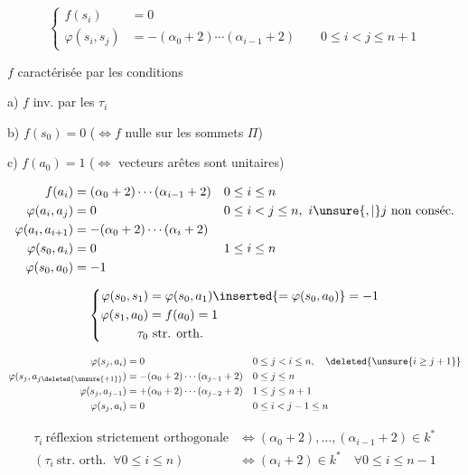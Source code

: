 \[
\left\{\begin{aligned}
f(s_i)&=0\\
\varphi(s_i,s_j)&=-(\alpha_0+2)\cdots(\alpha_{i-1}+2)\qquad 0\le i<j\le n+1
\end{aligned}\right.
\]

$f$ caractérisée par les conditions

a) $f$ inv. par les $\tau_i$

b) $f(s_0)=0$ ($\iff f$ nulle sur les sommets   $\Pi$)

c) $f(a_0)=1$ ($\iff$  vecteurs arêtes sont unitaires)

\[
\begin{aligned}
f(a_i)&=(\alpha_0+2)\cdots(\alpha_{i-1}+2) &&0\le i\le n\\
\varphi(a_i,a_j)&=0 &&0\le i<j\le n,\ i\unsure{,|{}}j\ \text{non conséc.}\\
\varphi(a_i,a_{i+1})&=-(\alpha_0+2)\cdots(\alpha_i+2)\\
\varphi(s_0,a_i)&=0 &&1\le i\le n\\
\varphi(s_0,a_0)&=-1
\end{aligned}
\]

\[
\left\{\begin{aligned}
\varphi(s_0,s_1)&=\varphi(s_0,a_1)\inserted{=\varphi(s_0,a_0)}=-1\\
\varphi(s_1,a_0)&=f(a_0)=1\\
\tau_0&\ \text{str. orth.}
\end{aligned}\right.
\]

\[
\begin{aligned}
\varphi(s_j,a_i)&=0 &&0\le j<i\le n,\quad\deleted{\unsure{i\geq j+1}}\\
\varphi(s_j,a_{j\deleted{\unsure{+1}}})&=-(\alpha_0+2)\cdots(\alpha_{j-1}+2)&&0\le j\le n\\
\varphi(s_j,a_{j-1})&=+(\alpha_0+2)\cdots(\alpha_{j-2}+2)&&1\le j\le n+1\\
\varphi(s_j,a_i)&=0&&0\le i<j-1\le n
\end{aligned}
\]


\[
\begin{aligned}
\tau_i\ \text{réflexion strictement orthogonale}&\iff(\alpha_0+2),\ldots,(\alpha_{i-1}+2)\in k^{*}\\
(\tau_i\ \text{str. orth. }\ \forall 0\le i\le n)&\iff(\alpha_i+2)\in k^{*}\quad\forall 0\le i\le n-1
\end{aligned}
\]
